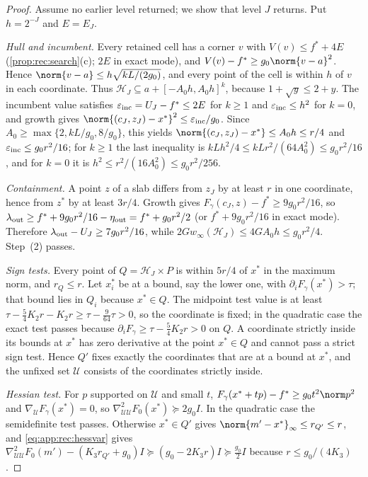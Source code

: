 \begin{proof}
Assume no earlier level returned; we show that level $J$ returns. Put
$h=2^{-J}$ and $E=E_J$.

\emph{Hull and incumbent.} Every retained cell has a corner $v$ with
$V(v)\le f^*+4E$ (\cref{prop:rec:search}(c); $2E$ in exact mode), and
$V(v)-f^*\ge g_0\norm{v-a}^2$. Hence
$\norm{v-a}\le h\sqrt{kL/(2g_0)}$, and every point of the cell is within
$h$ of $v$ in each coordinate. Thus $\mathcal H_J\subseteq a+[-A_0h,A_0h]^k$,
because $1+\sqrt y\le2+y$. The incumbent value satisfies
$\varepsilon_{\rm inc}=U_J-f^*\le2E$ for $k\ge1$ and
$\varepsilon_{\rm inc}\le h^2$ for $k=0$, and growth gives
$\norm{(c_J,z_J)-x^*}^2\le\varepsilon_{\rm inc}/g_0$. Since
$A_0\ge\max\{2,kL/g_0,8/g_0\}$, this yields $\norm{(c_J,z_J)-x^*}\le A_0h\le r/4$
and $\varepsilon_{\rm inc}\le g_0r^2/16$; for $k\ge1$ the last inequality is
$kLh^2/4\le kLr^2/(64A_0^2)\le g_0r^2/16$, and for $k=0$ it is
$h^2\le r^2/(16A_0^2)\le g_0r^2/256$.

\emph{Containment.} A point $z$ of a slab differs from $z_J$ by at least $r$
in one coordinate, hence from $z^*$ by at least $3r/4$. Growth gives
$F_\gamma(c_J,z)-f^*\ge9g_0r^2/16$, so
$\lambda_{\rm out}\ge f^*+9g_0r^2/16-\eta_{\rm out}=f^*+g_0r^2/2$ (or
$f^*+9g_0r^2/16$ in exact mode). Therefore
$\lambda_{\rm out}-U_J\ge7g_0r^2/16$, while
$2Gw_\infty(\mathcal H_J)\le4GA_0h\le g_0r^2/4$. Step~(2) passes.

\emph{Sign tests.} Every point of $Q=\mathcal H_J\times P$ is within $5r/4$
of $x^*$ in the maximum norm, and $r_Q\le r$. Let $x^*_i$ be at a bound, say
the lower one, with $\partial_iF_\gamma(x^*)>\tau$; that bound lies in
$Q_i$ because $x^*\in Q$. The midpoint test value is at least
$\tau-\frac54K_2r-K_2r\ge\tau-\frac9{64}\tau>0$, so the coordinate is fixed;
in the quadratic case the exact test passes because $\partial_iF_\gamma\ge
\tau-\frac54K_2r>0$ on $Q$. A coordinate strictly inside its bounds at $x^*$
has zero derivative at the point $x^*\in Q$ and cannot pass a strict sign
test. Hence $Q'$ fixes exactly the coordinates that are at a bound at $x^*$,
and the unfixed set $\mathcal U$ consists of the coordinates strictly inside.

\emph{Hessian test.} For $p$ supported on $\mathcal U$ and small $t$,
$F_\gamma(x^*+tp)-f^*\ge g_0t^2\norm p^2$ and $\nabla_{\mathcal U}F_\gamma(x^*)=0$,
so $\nabla^2_{\mathcal U\mathcal U}F_0(x^*)\succeq2g_0I$. In the quadratic case
the semidefinite test passes. Otherwise $x^*\in Q'$ gives
$\norm{m'-x^*}_\infty\le r_{Q'}\le r$, and \eqref{eq:app:rec:hessvar} gives
$\nabla^2_{\mathcal U\mathcal U}F_0(m')-(K_3r_{Q'}+g_0)I\succeq
(g_0-2K_3r)I\succeq\frac{g_0}2I$ because $r\le g_0/(4K_3)$.
\end{proof}

